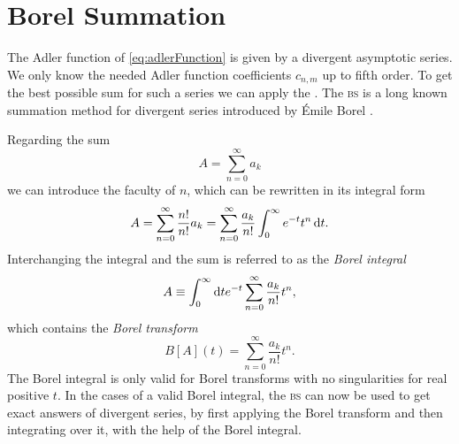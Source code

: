 \documentclass[../../index.tex]{subfiles}
\begin{document}
\section{Borel Summation}
The Adler function of \cref{eq:adlerFunction} is given by a divergent asymptotic
series. We only know the needed Adler function coefficients \(c_{n,m}\) up to
fifth order. To get the best possible sum for such a series we can apply the
. The \textsc{bs} is a long known summation method
for divergent series introduced by Émile Borel \cite{Emile1899}.

Regarding the sum
\begin{equation}
  A = \sum_{n=0}^{\infty} a_k
\end{equation}
we can introduce the faculty of \(n\), which can be rewritten in its integral
form
\begin{equation}
  A = \sum_{n=0}^\infty \frac{n!}{n!} a_k = \sum_{n=0}^{\infty} \frac{a_k}{n!} \int_0^\infty e^{-t} t^n \dif t.
\end{equation}
Interchanging the integral and the sum is referred to as the \textit{Borel
  integral}
\begin{equation}
  A \equiv \int_0^\infty \dif t e^{-t} \sum_{n=0}^\infty \frac{a_k}{n!} t^n,
  \label{eq:borelSum}
\end{equation}
which contains the \textit{Borel transform}
\begin{equation}
  B[A](t) = \sum_{n=0}^\infty \frac{a_k}{n!} t^n.
\end{equation}
The Borel integral is only valid for Borel transforms with no singularities for
real positive \(t\). In the cases of a valid Borel integral, the \textsc{bs} can
now be used to get exact answers of divergent series, by first applying the
Borel transform and then integrating over it, with the help of the Borel
integral.
\end{document}
